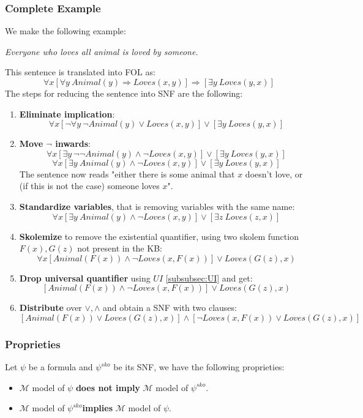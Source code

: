 \documentclass[10pt,a4paper]{article}
\begin{document}
\begin{itemize}
\subsubsection{Complete Example}
We make the following example:
\begin{center}
\textit{Everyone who loves all animal is loved by someone.}
\end{center} 
This sentence is translated into FOL as:
\[\forall x[ \forall y\ Animal(y)\Rightarrow Loves(x,y)]\Rightarrow [\exists y\ Loves(y,x)]\]
The steps for reducing the sentence into SNF are the following:
\begin{enumerate}

\item \textbf{Eliminate implication}:
\[\forall x[ \neg \forall y\ \neg Animal(y)\vee Loves(x,y)]\vee [\exists y\ Loves(y,x)]\]
\item \textbf{Move $\neg$ inwards}:
\[\forall x[ \exists y\ \neg \neg Animal(y)\wedge \neg Loves(x,y)]\vee [\exists y\ Loves(y,x)]\]
\[\forall x[ \exists y\ Animal(y)\wedge \neg Loves(x,y)]\vee [\exists y\ Loves(y,x)]\]
The sentence now reads "either there is some animal that $x$ doesn't love, or (if this is not the case) someone loves $x$".

\item \textbf{Standardize variables}, that is removing variables with the same name:
\[\forall x[ \exists y\ Animal(y)\wedge \neg Loves(x,y)]\vee [\exists z\ Loves(z,x)]\]

\item \textbf{Skolemize} to remove the existential quantifier, using two skolem function $F(x),G(z)$ not present in the KB:
  \[\forall x[ Animal(F(x))\wedge \neg Loves(x,F(x))]\vee Loves(G(z),x)\]

\item \textbf{Drop universal quantifier} using $UI$ \ref{subsubsec:UI} and get:
\[[ Animal(F(x))\wedge \neg Loves(x,F(x))]\vee Loves(G(z),x)\]
\item \textbf{Distribute} over $\vee,\wedge$ and obtain a SNF with two clauses:
\[[ Animal(F(x))\vee Loves(G(z),x)]\wedge[\neg Loves(x,F(x)) \vee  Loves(G(z),x)]\]

\end{enumerate}

\subsubsection{Proprieties}
Let $\psi$ be a formula and $\psi^{sko}$ be its SNF, we have the following proprieties:
\begin{itemize}
\item $\mathcal{M}$ model of $\psi$ \textbf{does not imply}  $\mathcal{M}$ model of $\psi^{sko}$.
\item $\mathcal{M}$ model of $\psi^{sko}$\textbf{implies}  $\mathcal{M}$ model of $\psi$.


\end{itemize}
\end{itemize}
\end{document}
